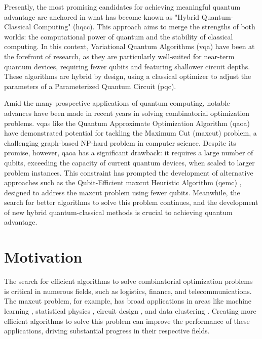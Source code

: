 Presently, the most promising candidates for achieving meaningful quantum advantage are anchored in what has become known as "Hybrid Quantum-Classical Computing" (\acrshort{hqcc}). This approach aims to merge the strengths of both worlds: the computational power of quantum and the stability of classical computing. In this context, Variational Quantum Algorithms (\acrshort{vqa}) have been at the forefront of research, as they are particularly well-suited for near-term quantum devices, requiring fewer qubits and featuring shallower circuit depths. These algorithms are hybrid by design, using a classical optimizer to adjust the parameters of a Parameterized Quantum Circuit (\acrshort{pqc}).

Amid the many prospective applications of quantum computing, notable advances have been made in recent years in solving combinatorial optimization problems. \acrshort{vqa}\textcolor{gray}{s} like the Quantum Approximate Optimization Algorithm (\acrshort{qaoa}) \cite{farhi2014quantum} have demonstrated potential for tackling the Maximum Cut (\acrshort{maxcut}) problem, a challenging graph-based NP-hard problem in computer science. Despite its promise, however, \acrshort{qaoa} has a significant drawback: it requires a large number of qubits, exceeding the capacity of current quantum devices, when scaled to larger problem instances. This constraint has prompted the development of alternative approaches such as the Qubit-Efficient \acrshort{maxcut} Heuristic Algorithm (\acrshort{qemc}) \cite{tenecohen2023variational}, designed to address the \acrshort{maxcut} problem using fewer qubits. Meanwhile, the search for better algorithms to solve this problem continues, and the development of new hybrid quantum-classical methods is crucial to achieving quantum advantage.

\section{Motivation}
\label{section:motivation}



The search for efficient algorithms to solve combinatorial optimization problems is critical in numerous fields, such as logistics, finance, and telecommunications. The \acrshort{maxcut} problem, for example, has broad applications in areas like machine learning \cite{937505}, statistical physics \cite{Barahona_Grötschel_Jünger_Reinelt_1988}, circuit design \cite{Barahona_Grötschel_Jünger_Reinelt_1988}, and data clustering \cite{10.1007/11893318_21}. Creating more efficient algorithms to solve this problem can improve the performance of these applications, driving substantial progress in their respective fields.

